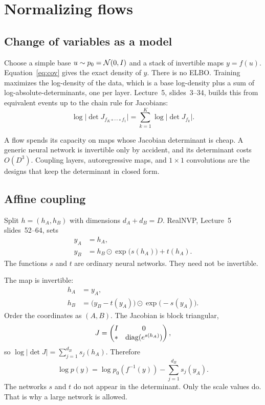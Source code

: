 \chapter{Normalizing flows}
\label{ch:flow}

\section{Change of variables as a model}

Choose a simple base $u\sim p_0=\mathcal{N}(0,I)$ and a stack of invertible maps $y=f(u)$. Equation~\eqref{eq:cov} gives the exact density of $y$. There is no ELBO. Training maximizes the log-density of the data, which is a base log-density plus a sum of log-absolute-determinants, one per layer. Lecture~5, slides~3--34, builds this from equivalent events up to the chain rule for Jacobians:
\[
\log\lvert\det J_{f_K\circ\cdots\circ f_1}\rvert
=\sum_{k=1}^K\log\lvert\det J_{f_k}\rvert.
\]

\begin{intbox}
A flow spends its capacity on maps whose Jacobian determinant is cheap. A generic neural network is invertible only by accident, and its determinant costs $O(D^3)$. Coupling layers, autoregressive maps, and $1\times 1$ convolutions are the designs that keep the determinant in closed form.
\end{intbox}

\section{Affine coupling}

Split $h=(h_A,h_B)$ with dimensions $d_A+d_B=D$. RealNVP, Lecture~5 slides~52--64, sets
\begin{align*}
y_A&=h_A,\\
y_B&=h_B\odot\exp\bigl(s(h_A)\bigr)+t(h_A).
\end{align*}
The functions $s$ and $t$ are ordinary neural networks. They need not be invertible.

\begin{resultbox}
The map is invertible:
\begin{align*}
h_A&=y_A,\\
h_B&=\bigl(y_B-t(y_A)\bigr)\odot\exp\bigl(-s(y_A)\bigr).
\end{align*}
Order the coordinates as $(A,B)$. The Jacobian is block triangular,
\[
J=\begin{pmatrix}I&0\\ \ast& \operatorname{diag}(e^{s(h_A)})\end{pmatrix},
\]
so $\log\lvert\det J\rvert=\sum_{j=1}^{d_B}s_j(h_A)$. Therefore
\[
\log p(y)=\log p_0(f^{-1}(y))-\sum_{j=1}^{d_B}s_j(y_A).
\]
The networks $s$ and $t$ do not appear in the determinant. Only the scale values do. That is why a large network is allowed.
\end{resultbox}

